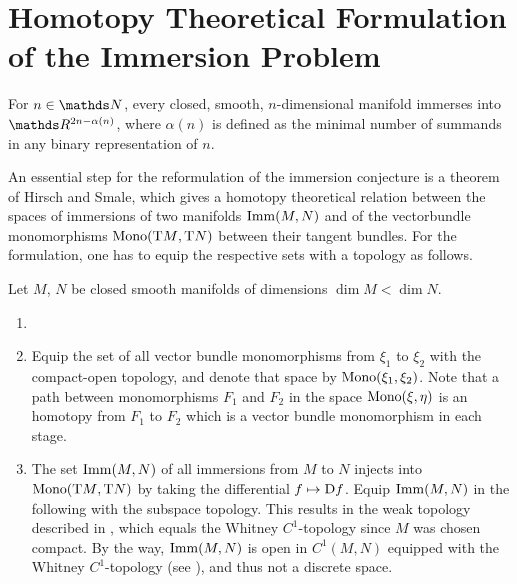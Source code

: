 % 


\chapter{Homotopy Theoretical Formulation of the Immersion Problem}


\begin{Thm}\label{thm:immersionconj}
  For $n\in\Nat$, every closed, smooth, $n$-dimensional manifold
  immerses into $\R^{2n-\alpha(n)}$, where $\alpha(n)$ is defined as
  the minimal number of summands in any binary representation of $n$.
\end{Thm}

An essential step for the reformulation of the immersion conjecture is
a theorem of Hirsch and Smale, which gives a homotopy theoretical
relation between the spaces of immersions of two manifolds $\mathrm{Imm}({M},{N})$
and of the vectorbundle monomorphisms $\mathrm{Mono}({\mathrm{T}M},{\mathrm{T}N})$ between
their tangent bundles. For the formulation, one has to equip the
respective sets with a topology as follows.
\begin{Def}
  Let $M$, $N$ be closed smooth manifolds of dimensions $\dim M < \dim N$.
  \begin{enumerate}
  \item %
  \item
    Equip the set of all vector bundle monomorphisms from $\xi_1$ to
    $\xi_2$ with the compact-open topology, and denote that space by
    $\mathrm{Mono}({\xi_1},{\xi_2})$.
    Note that a path between monomorphisms $F_1$ and $F_2$ in the
    space $\mathrm{Mono}({\xi},{\eta})$ is an homotopy from $F_1$ to $F_2$ which is
    a vector bundle monomorphism in each stage.
  \item %
    The set $\mathrm{Imm}({M},{N})$ of all immersions from $M$ to $N$ injects
    into $\mathrm{Mono}({\mathrm{T}M},{\mathrm{T}N})$ by taking the differential
    $f\mapsto\mathrm{D} f$.
    Equip $\mathrm{Imm}({M},{N})$ in the following with the subspace topology.
    This results in the weak topology described in
    \cite[Section~2.1]{hirsch}, which equals the Whitney
    $C^1$-topology since $M$ was chosen compact.
    By the way, $\mathrm{Imm}({M},{N})$ is open in $C^1(M,N)$ equipped with the
    Whitney $C^1$-topology
    (see \cite[Section~2.1, Theorem~1.1]{hirsch}),
    and thus not a discrete space.
  \end{enumerate}
\end{Def}

